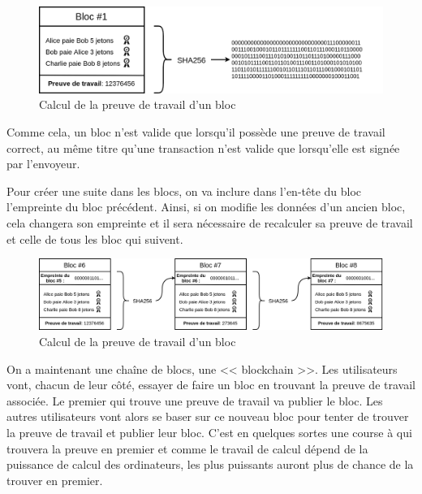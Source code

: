 \begin{figure}[H]
  \centering
  \includegraphics[width=\textwidth]{images/crypto_8}
  \caption{Calcul de la preuve de travail d'un bloc}
\end{figure}

Comme cela, un bloc n'est valide que lorsqu'il possède une preuve de travail correct, au même titre qu'une transaction n'est valide que lorsqu'elle est signée par l'envoyeur.

Pour créer une suite dans les blocs, on va inclure dans l'en-tête du bloc l'empreinte du bloc précédent. Ainsi, si on modifie les données d'un ancien bloc, cela changera son empreinte et il sera nécessaire de recalculer sa preuve de travail et celle de tous les bloc qui suivent.

\begin{figure}[H]
  \centering
  \includegraphics[width=\textwidth]{images/crypto_9}
  \caption{Calcul de la preuve de travail d'un bloc}
\end{figure}

On a maintenant une chaîne de blocs, une << blockchain >>. Les utilisateurs vont, chacun de leur côté, essayer de faire un bloc en trouvant la preuve de travail associée. Le premier qui trouve une preuve de travail va publier le bloc. Les autres utilisateurs vont alors se baser sur ce nouveau bloc pour tenter de trouver la preuve de travail et publier leur bloc. C'est en quelques sortes une course à qui trouvera la preuve en premier et comme le travail de calcul dépend de la puissance de calcul des ordinateurs, les plus puissants auront plus de chance de la trouver en premier. 

